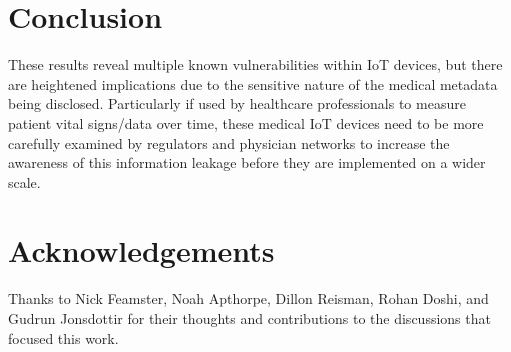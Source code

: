 \section{Conclusion}

These results reveal multiple known vulnerabilities within IoT devices, but there are heightened implications due to the sensitive nature of the medical metadata being disclosed. Particularly if used by healthcare professionals to measure patient vital signs/data over time, these medical IoT devices need to be more carefully examined by regulators and physician networks to increase the awareness of this information leakage before they are implemented on a wider scale. 

\appendix

\section*{Acknowledgements}
Thanks to Nick Feamster, Noah Apthorpe, Dillon Reisman, Rohan Doshi, and Gudrun Jonsdottir for their thoughts and contributions to the discussions that focused this work. 
